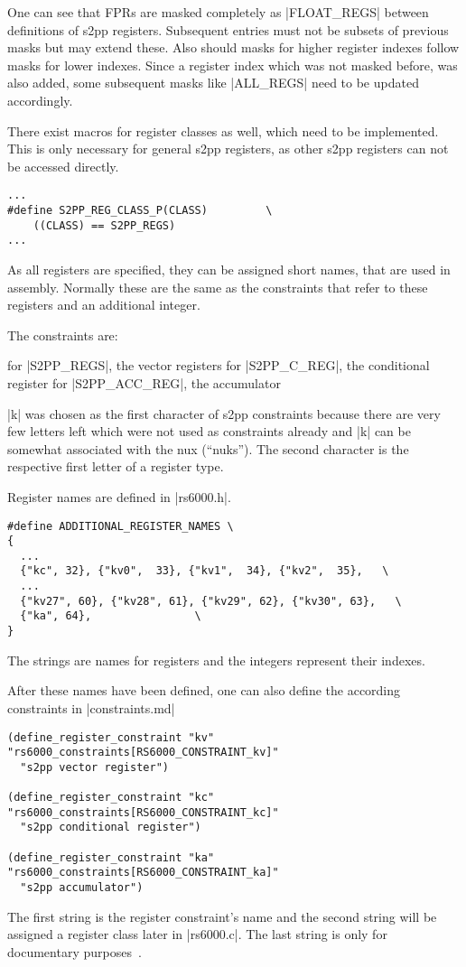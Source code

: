 One can see that \acp{FPR} are masked completely as |FLOAT_REGS| between definitions of \ac{s2pp} registers.
Subsequent entries must not be subsets of previous masks but may extend these.
Also should masks for higher register indexes follow masks for lower indexes.
Since a register index which was not masked before, was also added, some subsequent masks like |ALL_REGS| need to be updated accordingly.

There exist macros for register classes as well, which need to be implemented.
This is only necessary for general \ac{s2pp} registers, as other \ac{s2pp} registers can not be accessed directly.
\begin{lstlisting}
...
#define S2PP_REG_CLASS_P(CLASS)         \
    ((CLASS) == S2PP_REGS)
...
\end{lstlisting}

As all registers are specified, they can be assigned short names, that are used in assembly.
Normally these are the same as the constraints that refer to these registers and an additional integer.

The constraints are:
\begin{description}
         for |S2PP_REGS|, the vector registers
         for |S2PP_C_REG|, the conditional register
         for |S2PP_ACC_REG|, the accumulator
\end{description}

|k| was chosen as the first character of s2pp constraints because there are very few letters left which were not used as constraints already and |k| can be somewhat associated with the nux (``nuks'').
The second character is the respective first letter of a register type.

Register names are defined in |rs6000.h|.
\begin{lstlisting}
#define ADDITIONAL_REGISTER_NAMES \
{
  ...
  {"kc", 32}, {"kv0",  33}, {"kv1",  34}, {"kv2",  35},   \
  ...
  {"kv27", 60}, {"kv28", 61}, {"kv29", 62}, {"kv30", 63},   \
  {"ka", 64},                \
}
\end{lstlisting}
The strings are names for registers and the integers represent their indexes.

After these names have been defined, one can also define the according constraints in |constraints.md|
\begin{lstlisting}[linewidth=1.1\textwidth]
(define_register_constraint "kv" "rs6000_constraints[RS6000_CONSTRAINT_kv]"
  "s2pp vector register")

(define_register_constraint "kc" "rs6000_constraints[RS6000_CONSTRAINT_kc]"
  "s2pp conditional register")

(define_register_constraint "ka" "rs6000_constraints[RS6000_CONSTRAINT_ka]"
  "s2pp accumulator")
\end{lstlisting}
The first string is the register constraint's name and the second string will be assigned a register class later in |rs6000.c|.
The last string is only for documentary purposes~\citep[ch.~16.8]{GCCint}.

